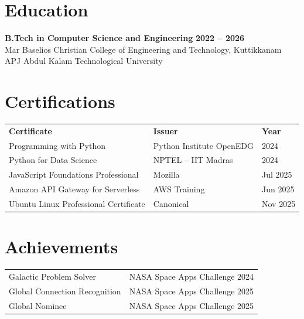 \documentclass[10pt, a4paper]{article}
\begin{document}
\section*{Education}

\textbf{B.Tech in Computer Science and Engineering} \hfill \textbf{2022 -- 2026}\\
Mar Baselios Christian College of Engineering and Technology, Kuttikkanam \hfill APJ Abdul Kalam Technological University

\section*{Certifications}

\renewcommand{\arraystretch}{1.0}
\begin{tabular}{@{} p{7.8cm} p{6.5cm} p{2.5cm} @{}}
\textbf{Certificate}                  & \textbf{Issuer}              & \textbf{Year} \\[1pt]
Programming with Python               & Python Institute OpenEDG   & 2024 \\
Python for Data Science               & NPTEL -- IIT Madras          & 2024 \\
JavaScript Foundations Professional   & Mozilla                      & Jul 2025 \\
Amazon API Gateway for Serverless     & AWS Training                 & Jun 2025 \\
Ubuntu Linux Professional Certificate & Canonical                    & Nov 2025 \\
\end{tabular}

\section*{Achievements}

\begin{tabular}{@{} p{9.5cm} p{8cm} @{}}
Galactic Problem Solver              & NASA Space Apps Challenge 2024 \\
Global Connection Recognition        & NASA Space Apps Challenge 2025 \\
Global Nominee                       & NASA Space Apps Challenge 2025 \\
\end{tabular}
\end{document}
